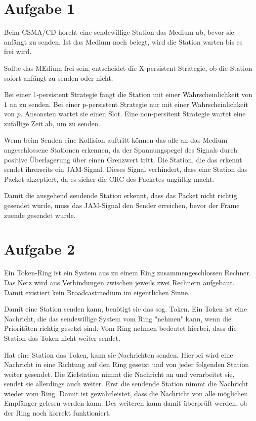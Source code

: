 \section{Aufgabe 1}

Beim CSMA/CD horcht eine sendewillige Station das Medium ab, bevor sie anfängt
zu senden. Ist das Medium noch belegt, wird die Station warten bis es frei wird.

Sollte das MEdium frei sein, entscheidet die X-persistent Strategie, ob die
Station sofort anfängt zu senden oder nicht.

Bei einer 1-persistent Strategie fängt die Station mit einer Wahrscheinlichkeit
von $1$ an zu senden. Bei einer p-persistent Strategie nur mit einer
Wahrscheinlichkeit von $p$. Ansonsten wartet sie einen Slot. Eine non-persitent
Strategie wartet eine zufällige Zeit ab, um zu senden.

Wenn beim Senden eine Kollision auftritt können das alle an das Medium
angeschlossene Stationen erkennen, da der Spannungspegel des Signals durch
positive Überlagerung über einen Grenzwert tritt. Die Station, die das erkennt
sendet ihrerseits ein JAM-Signal. Dieses Signal verhindert, dass eine Station
das Packet akzeptiert, da es sicher die CRC des Packetes ungültig macht.

Damit die ausgehend sendende Station erkennt, dass das Packet nicht richtig
gesendet wurde, muss das JAM-Signal den Sender erreichen, bevor der Frame zuende
gesendet wurde.


\section{Aufgabe 2}

Ein Token-Ring ist ein System aus zu einem Ring zusammengeschlossen Rechner. Das
Netz wird aus Verbindungen zwischen jeweils zwei Rechnern aufgebaut. Damit
existiert kein Broadcastmedium im eigentlichen Sinne.

Damit eine Station senden kann, benötigt sie das sog. Token. Ein Token ist eine
Nachricht, die das sendewillige System vom Ring "nehmen" kann, wenn die
Prioritäten richtig gesetzt sind. Vom Ring nehmen bedeutet hierbei, dass die
Station das Token nicht weiter sendet. 

Hat eine Station das Token, kann sie Nachrichten senden. Hierbei wird eine
Nachricht in eine Richtung auf den Ring gesetzt und von jeder folgenden Station
weiter gesendet. Die Zielstation nimmt die Nachricht an und verarbeitet sie,
sendet sie allerdings auch weiter. Erst die sendende Station nimmt die Nachricht
wieder vom Ring. Damit ist gewährleistet, dass die Nachricht von alle möglichen
Empfänger gelesen werden kann. Des weiteren kann damit überprüft werden, ob der
Ring noch korrekt funktioniert.

